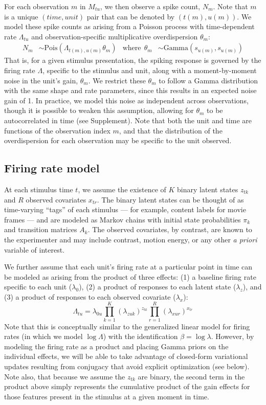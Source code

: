 \documentclass[12pt,a4paper]{article}
\begin{document}
For each observation $m$ in $M_{tu}$, we then observe a spike count, $N_m$. Note that $m$ is a unique $(time, unit)$ pair that can be denoted by $(t(m), u(m))$. We model these spike counts as arising from a Poisson process with time-dependent rate $\Lambda_{tu}$ and observation-specific multiplicative overdispersion $\theta_m$:
\begin{align}
    \label{obs_model}
    N_{m} &\sim \text{Pois}(\Lambda_{t(m), u(m)} \theta_m) &
    \text{where} ~~ \theta_m &\sim \text{Gamma}(s_{u(m)}, s_{u(m)})
\end{align}
That is, for a given stimulus presentation, the spiking response is governed by the firing rate $\Lambda$, specific to the stimulus and unit, along with a moment-by-moment noise in the unit's gain, $\theta_m$. We restrict these $\theta_m$ to follow a Gamma distribution with the same shape and rate parameters, since this results in an expected noise gain of 1. In practice, we model this noise as independent across observations, though it is possible to weaken this assumption, allowing for $\theta_m$ to be autocorrelated in time (see Supplement). Note that both the unit and time are functions of the observation index $m$, and that the distribution of the overdispersion for each observation may be specific to the unit observed.

\subsection*{Firing rate model}
At each stimulus time $t$, we assume the existence of $K$ binary latent states $z_{tk}$ and $R$ observed covariates $x_{tr}$. The binary latent states can be thought of as time-varying ``tags'' of each stimulus --- for example, content labels for movie frames --- and are modeled as Markov chains with initial state probabilities $\pi_k$ and transition matrices $A_k$. The observed covariates, by contrast, are known to the experimenter and may include contrast, motion energy, or any other \emph{a priori} variable of interest.

We further assume that each unit's firing rate at a particular point in time can be modeled as arising from the product of three effects: (1) a baseline firing rate specific to each unit ($\lambda_0$), (2) a product of responses to each latent state ($\lambda_z$), and (3) a product of responses to each observed covariate ($\lambda_x$):
\begin{equation}
    \label{fr_model}
    \Lambda_{tu} = \lambda_{0u} \prod_{k = 1}^K (\lambda_{zuk})^{z_{tk}}
    \prod_{r = 1}^R (\lambda_{xur})^{x_{tr}}
\end{equation}
Note that this is conceptually similar to the generalized linear model for firing rates (in which we model $\log \Lambda$) with the identification $\beta = \log \lambda$. However, by modeling the firing rate as a product and placing Gamma priors on the individual effects, we will be able to take advantage of closed-form variational updates resulting from conjugacy that avoid explicit optimization (see below). Note also, that because we assume the $z_{tk}$ are binary, the second term in the product above simply represents the cumulative product of the gain effects for those features present in the stimulus at a given moment in time.
\end{document}
